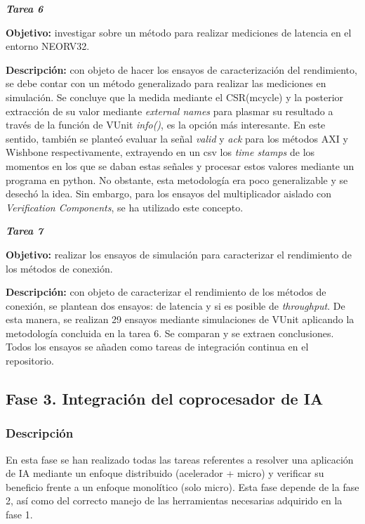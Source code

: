 \noindent \textbf{\textit{Tarea 6}}

\textbf{Objetivo:} investigar sobre un método para realizar mediciones de latencia en el entorno NEORV32. 

\textbf{Descripción:} con objeto de hacer los ensayos de caracterización del rendimiento, se debe contar con un método generalizado para realizar las mediciones en simulación.
Se concluye que la medida mediante el CSR(mcycle) y la posterior extracción de su valor mediante \textit{external names} para plasmar su resultado a través de la función de VUnit \textit{info()}, es la opción más interesante.
En este sentido, también se planteó evaluar la señal \textit{valid} y \textit{ack} para los métodos AXI y Wishbone respectivamente, extrayendo en un csv los \textit{time stamps} de los momentos en los que se daban estas señales y procesar estos valores mediante un programa en python.
No obstante, esta metodología era poco generalizable y se desechó la idea.
Sin embargo, para los ensayos del multiplicador aislado con \textit{Verification Components}, se ha utilizado este concepto.

\noindent \textbf{\textit{Tarea 7}}

\textbf{Objetivo:} realizar los ensayos de simulación para caracterizar el rendimiento de los métodos de conexión. 

\textbf{Descripción:} con objeto de caracterizar el rendimiento de los métodos de conexión, se plantean dos ensayos: de latencia y si es posible de \textit{throughput}.
De esta manera, se realizan 29 ensayos mediante simulaciones de VUnit aplicando la metodología concluida en la tarea 6.
Se comparan y se extraen conclusiones.
Todos los ensayos se añaden como tareas de integración continua en el repositorio.

\subsection{Fase 3. Integración del coprocesador de IA}

\subsubsection{Descripción}

En esta fase se han realizado todas las tareas referentes a resolver una aplicación de IA mediante un enfoque distribuido (acelerador + micro) y verificar su beneficio frente a un enfoque monolítico (solo micro).
Esta fase depende de la fase 2, así como del correcto manejo de las herramientas necesarias adquirido en la fase 1.

